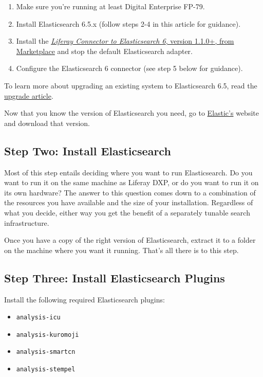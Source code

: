 \begin{enumerate}
\def\labelenumi{\arabic{enumi}.}
\item
  Make sure you're running at least Digital Enterprise FP-79.
\item
  Install Elasticsearch 6.5.x (follow steps 2-4 in this article for
  guidance).
\item
  Install the \href{https://web.liferay.com/marketplace}{\emph{Liferay
  Connector to Elasticsearch 6}, version 1.1.0+, from Marketplace} and
  stop the default Elasticsearch adapter.
\item
  Configure the Elasticsearch 6 connector (see step 5 below for
  guidance).
\end{enumerate}

To learn more about upgrading an existing system to Elasticsearch 6.5,
read the
\href{/docs/7-0/deploy/-/knowledge_base/d/upgrading-to-elasticsearch-6}{upgrade
article}.

\noindent\hrulefill

Now that you know the version of Elasticsearch you need, go to
\href{https://www.elastic.co}{Elastic's} website and download that
version.

\subsection{Step Two: Install
Elasticsearch}\label{step-two-install-elasticsearch}

Most of this step entails deciding where you want to run Elasticsearch.
Do you want to run it on the same machine as Liferay DXP, or do you want
to run it on its own hardware? The answer to this question comes down to
a combination of the resources you have available and the size of your
installation. Regardless of what you decide, either way you get the
benefit of a separately tunable search infrastructure.

Once you have a copy of the right version of Elasticsearch, extract it
to a folder on the machine where you want it running. That's all there
is to this step.

\subsection{Step Three: Install Elasticsearch
Plugins}\label{step-three-install-elasticsearch-plugins}

Install the following required Elasticsearch plugins:

\begin{itemize}
\tightlist
\item
  \texttt{analysis-icu}
\item
  \texttt{analysis-kuromoji}
\item
  \texttt{analysis-smartcn}
\item
  \texttt{analysis-stempel}
\end{itemize}


